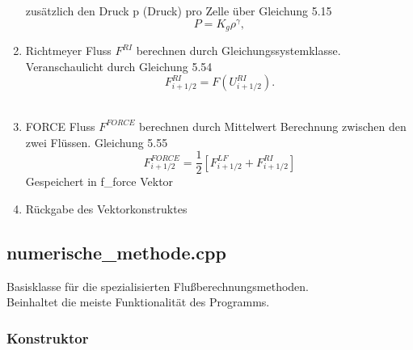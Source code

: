 \documentclass[12pt]{article}
\begin{document}
\begin{enumerate}
	zusätzlich den Druck p (Druck) pro Zelle über Gleichung 5.15\\
	\begin{equation}
	P = K_g \rho^{\gamma},\label{eq:druck_rho}
	\end{equation}
	\item Richtmeyer Fluss $F^{RI}$ berechnen durch Gleichungssystemklasse. Veranschaulicht durch Gleichung 5.54\\
	\begin{equation}
	F^{RI}_{i+1/2} = F(U^{RI}_{i+1/2}) .
	\end{equation}\\
	\item FORCE Fluss $F^{FORCE}$ berechnen durch Mittelwert Berechnung zwischen den zwei Flüssen. Gleichung 5.55\\
	\begin{equation}
	F^{FORCE}_{i+1/2} = \frac{1}{2}\left[ F^{LF}_{i+1/2} +  F^{RI}_{i+1/2} \right]
	\end{equation}
	Gespeichert in f\_force Vektor
	\item Rückgabe des Vektorkonstruktes
\end{enumerate}

\renewcommand{\labelenumi}{\alph{enumi})} 
\subsection{numerische\_methode.cpp}
Basisklasse für die spezialisierten Flußberechnungsmethoden.\\
Beinhaltet die meiste Funktionalität des Programms.

\subsubsection{Konstruktor} \label{sssec:numkons}
\end{document}
